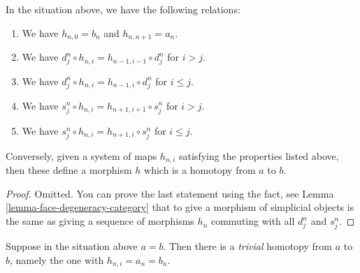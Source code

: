 \begin{lemma}
\label{lemma-relations-homotopy}
In the situation above, we have the following relations:
\begin{enumerate}
\item We have $h_{n, 0} = b_n$ and $h_{n, n + 1} = a_n$.
\item We have $d^n_j \circ h_{n, i} = h_{n - 1, i - 1} \circ d^n_j$
for $i > j$.
\item We have $d^n_j \circ h_{n, i} = h_{n - 1, i} \circ d^n_j$
for $i \leq j$.
\item We have $s^n_j \circ h_{n, i} = h_{n + 1, i + 1} \circ s^n_j$
for $i > j$.
\item We have $s^n_j \circ h_{n, i} = h_{n + 1, i} \circ s^n_j$
for $i \leq j$.
\end{enumerate}
Conversely, given a system of maps $h_{n, i}$ satisfying the
properties listed above, then these define a morphism
$h$ which is a homotopy from $a$ to $b$.
\end{lemma}

\begin{proof}
Omitted. You can prove the last statement using the fact,
see Lemma \ref{lemma-face-degeneracy-category} that
to give a morphism of simplicial objects is the
same as giving a sequence of morphisms $h_n$ commuting
with all $d^n_j$ and $s^n_j$.
\end{proof}

\begin{example}
\label{example-trivial-homotopy}
Suppose in the situation above $a = b$. Then there is a {\it trivial}
homotopy from $a$ to $b$, namely the one with $h_{n, i} = a_n = b_n$.
\end{example}

